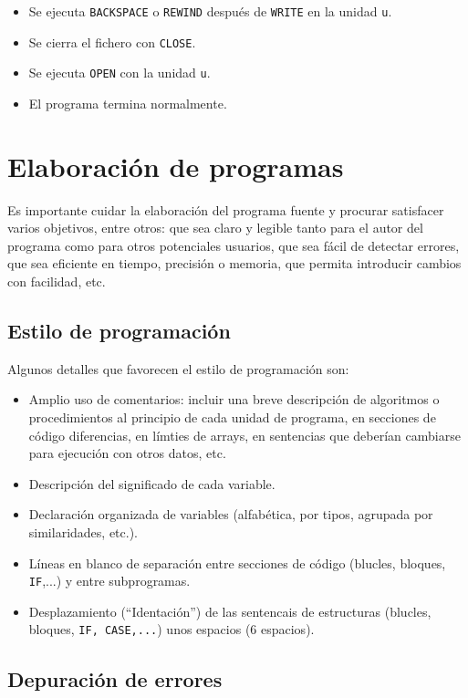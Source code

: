 \begin{itemize}
	\item Se ejecuta \texttt{BACKSPACE} o  \texttt{REWIND} después de {\tt WRITE} en la unidad {\tt u}.
	\item Se cierra el fichero con {\tt CLOSE}.
	\item Se ejecuta {\tt OPEN} con la unidad {\tt u}.
	\item El programa termina normalmente.
\end{itemize}

\section{Elaboración de programas}

Es importante cuidar la elaboración del programa fuente y procurar satisfacer varios objetivos, entre otros: que sea claro y legible tanto para el autor del programa como para otros potenciales usuarios, que sea fácil de detectar errores, que sea eficiente en tiempo, precisión o memoria, que permita introducir cambios con facilidad, etc.

\subsection{Estilo de programación}

Algunos detalles que favorecen el estilo de programación son:

\begin{itemize}
	\item Amplio uso de comentarios: incluir una breve descripción de algoritmos o procedimientos al principio de cada unidad de programa, en secciones de código diferencias, en límties de arrays, en sentencias que deberían cambiarse para ejecución con otros datos, etc.
	\item Descripción del significado de cada variable.
	\item Declaración organizada de variables (alfabética, por tipos, agrupada por similaridades, etc.).
	\item Líneas en blanco de separación entre secciones de código (blucles, bloques, {\tt IF},...) y entre subprogramas.
	\item Desplazamiento (``Identación'') de las sentencais de estructuras (blucles, bloques, {\tt IF, CASE,...}) unos espacios (6 espacios).

\end{itemize}
\subsection{Depuración de errores}

